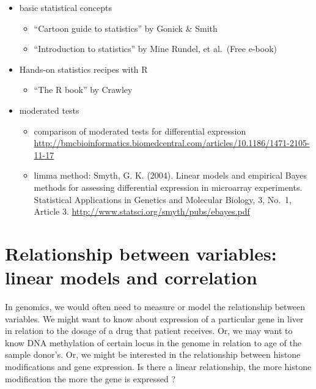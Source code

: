 \documentclass[12pt,]{krantz}
\providecommand{\tightlist}{%
  \setlength{\itemsep}{0pt}\setlength{\parskip}{0pt}}
\theoremstyle{definition}
\theoremstyle{definition}
\theoremstyle{definition}
\theoremstyle{remark}
\begin{document}
\begin{itemize}
\tightlist
\item
  basic statistical concepts

  \begin{itemize}
  \tightlist
  \item
    ``Cartoon guide to statistics'' by Gonick \& Smith
  \item
    ``Introduction to statistics'' by Mine Rundel, et al.~(Free e-book)
  \end{itemize}
\item
  Hands-on statistics recipes with R

  \begin{itemize}
  \tightlist
  \item
    ``The R book'' by Crawley
  \end{itemize}
\item
  moderated tests

  \begin{itemize}
  \tightlist
  \item
    comparison of moderated tests for differential expression
    \url{http://bmcbioinformatics.biomedcentral.com/articles/10.1186/1471-2105-11-17}
  \item
    limma method: Smyth, G. K. (2004). Linear models and empirical Bayes
    methods for assessing differential expression in microarray
    experiments. Statistical Applications in Genetics and Molecular
    Biology, 3, No.~1, Article 3.
    \url{http://www.statsci.org/smyth/pubs/ebayes.pdf}
  \end{itemize}
\end{itemize}

\hypertarget{relationship-between-variables-linear-models-and-correlation}{%
\section{Relationship between variables: linear models and
correlation}\label{relationship-between-variables-linear-models-and-correlation}}

In genomics, we would often need to measure or model the relationship
between variables. We might want to know about expression of a
particular gene in liver in relation to the dosage of a drug that
patient receives. Or, we may want to know DNA methylation of certain
locus in the genome in relation to age of the sample donor's. Or, we
might be interested in the relationship between histone modifications
and gene expression. Is there a linear relationship, the more histone
modification the more the gene is expressed ?
\end{document}
